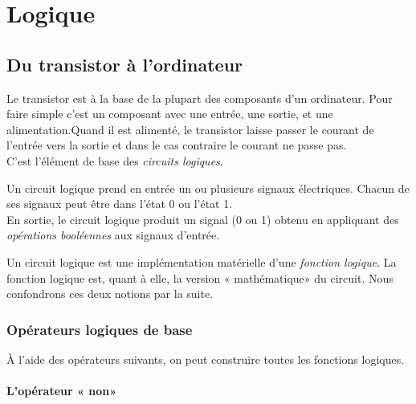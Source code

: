 \chapter{Logique}
\section{Du transistor à l'ordinateur}
Le transistor est à la base de la plupart des composants d'un ordinateur. Pour faire simple c'est un composant avec une entrée, une sortie, et une alimentation.Quand il est alimenté, le transistor laisse passer le courant de l'entrée vers la sortie et dans le cas contraire le courant ne passe pas.\\
C'est l'élément de base des \textit{circuits logiques}.
\begin{definition}
    Un circuit logique prend en entrée un ou plusieurs signaux électriques. Chacun de ses signaux peut être dans l'état 0 ou l'état 1.\\
    En sortie, le circuit logique produit un signal (0 ou 1) obtenu en appliquant des \textit{opérations booléennes} aux signaux d'entrée.
\end{definition}

Un circuit logique est une implémentation matérielle d'une \textit{fonction logique}. La fonction logique est, quant à elle, la version « mathématique»  du circuit. Nous confondrons ces deux notions par la suite.

\subsection{Opérateurs logiques de base}

À l'aide des opérateurs suivants, on peut construire toutes les fonctions logiques.

\subsubsection*{L'opérateur « non» }

